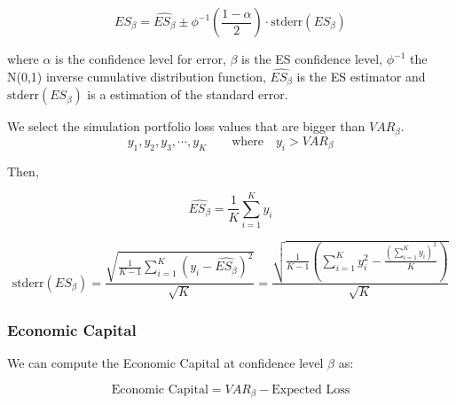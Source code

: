 \documentclass[a4paper,12pt,final]{article}
\begin{document}
\begin{displaymath}
ES_{\beta} = \widehat{ES_{\beta}} \pm \phi^{-1}\left(\frac{1-\alpha}{2}\right) \cdot \textrm{stderr}(ES_{\beta})
\end{displaymath}

where $\alpha$ is the confidence level for error, $\beta$ is the ES confidence 
level, $\phi^{-1}$ the N(0,1) inverse cumulative distribution function, 
$\widehat{ES_{\beta}}$ is the ES estimator and $\textrm{stderr}(ES_{\beta})$
is a estimation of the standard error.
\newline

We select the simulation portfolio loss values that are bigger than $VAR_{\beta}$.
\begin{displaymath}
y_1, y_2, y_3, \cdots, y_K \qquad \textrm{where} \quad y_i > VAR_{\beta}
\end{displaymath}

Then,

\begin{displaymath}
\widehat{ES_{\beta}} = \frac{1}{K} \sum_{i=1}^{K} y_i
\end{displaymath}

\begin{displaymath}
\textrm{stderr}(ES_{\beta}) =
\frac{\sqrt{\frac{1}{K-1} \sum_{i=1}^{K} \left( y_i - \widehat{ES_{\beta}} \right)^2}}{\sqrt{K}} =
\frac{\sqrt{\frac{1}{K-1} \left( \sum_{i=1}^{K} y_i^2 - \frac{\left(\sum_{i=1}^{K} y_i \right)^2}{K} \right)}}{\sqrt{K}}
\end{displaymath}

\subsubsection{Economic Capital}
We can compute the Economic Capital at confidence level $\beta$ as:

\begin{displaymath}
\textrm{Economic Capital} = VAR_{\beta} - \textrm{Expected Loss}
\end{displaymath}

\end{document}
